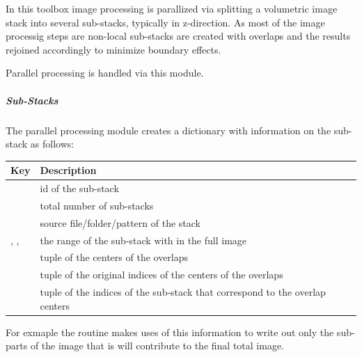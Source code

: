 \documentclass[letterpaper,10pt,english]{sphinxmanual}
\begin{document}
In this toolbox image processing is parallized via splitting a volumetric
image stack into several sub-stacks, typically in z-direction. As most of
the image processig steps are non-local sub-stacks are created with overlaps
and the results rejoined accordingly to minimize boundary effects.

Parallel processing is handled via this module.


\subparagraph{Sub-Stacks}
\label{api/ClearMap.ImageProcessing:sub-stacks}\label{api/ClearMap.ImageProcessing:substack}
The parallel processing module creates a dictionary with information on
the sub-stack as follows:

\begin{tabulary}{\linewidth}{|L|L|}
\hline
\textsf{\relax 
Key
} & \textsf{\relax 
Description
}\\
\hline
{}
 & 
id of the sub-stack
\\
\hline
{}
 & 
total number of sub-stacks
\\
\hline
{}
 & 
source file/folder/pattern of the stack
\\
\hline
{}, , 
 & 
the range of the sub-stack with in the full image
\\
\hline
{}
 & 
tuple of the centers of the overlaps
\\
\hline
{}
 & 
tuple of the original indices of the centers of
the overlaps
\\
\hline
{}
 & 
tuple of the indices of the sub-stack that
correspond to the overlap centers
\\
\hline\end{tabulary}


For exmaple the {\hyperref[api/ClearMap.ImageProcessing:ClearMap.ImageProcessing.StackProcessing.writeSubStack]{\emph{}}} routine makes uses of this information
to write out only the sub-parts of the image that is will contribute to the
final total image.
\end{document}
